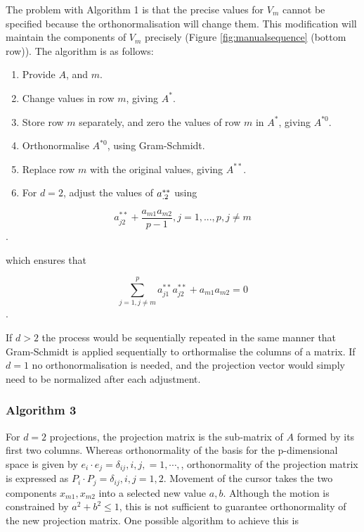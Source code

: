 \documentclass[]{interact}
\theoremstyle{plain}%
\theoremstyle{definition}
\theoremstyle{remark}
\providecommand{\tightlist}{%
  \setlength{\itemsep}{0pt}\setlength{\parskip}{0pt}}
\def\tightlist{}
\begin{document}
The problem with Algorithm 1 is that the precise values for \(V_m\)
cannot be specified because the orthonormalisation will change them.
This modification will maintain the components of \(V_m\) precisely
(Figure \ref{fig:manualsequence} (bottom row)). The algorithm is as
follows:

\begin{enumerate}
\def\labelenumi{\arabic{enumi}.}
\tightlist
\item
  Provide \(A\), and \(m\).
\item
  Change values in row \(m\), giving \(A^*\).
\item
  Store row \(m\) separately, and zero the values of row \(m\) in
  \(A^*\), giving \(A^{*0}\).
\item
  Orthonormalise \(A^{*0}\), using Gram-Schmidt.
\item
  Replace row \(m\) with the original values, giving \(A^{**}\).
\item
  For \(d=2\), adjust the values of \({\boldmath a}^{**}_{.2}\) using
\end{enumerate}

\[a^{**}_{j2}+\frac{a_{m1}a_{m2}}{p-1}, j=1, ..., p, j\neq m\].

which ensures that

\[\sum_{j=1, j\neq m}^p a^{**}_{j1}a^{**}_{j2} + a_{m1}a_{m2} = 0\].

If \(d>2\) the process would be sequentially repeated in the same manner
that Gram-Schmidt is applied sequentially to orthormalise the columns of
a matrix. If \(d=1\) no orthonormalisation is needed, and the projection
vector would simply need to be normalized after each adjustment.

\hypertarget{algorithm-3}{%
\subsubsection{Algorithm 3}\label{algorithm-3}}

For \(d=2\) projections, the projection matrix is the sub-matrix of
\(A\) formed by its first two columns. Whereas orthonormality of the
basis for the p-dimensional space is given by
\(e_i\cdot e_j=\delta_{ij},{i,j,=1,\cdots,}\), orthonormality of the
projection matrix is expressed as
\(P_i\cdot P_j=\delta_{ij}, {i,j=1,2}\). Movement of the cursor takes
the two components \({x_{m1},x_{m2}}\) into a selected new value
\({a,b}\). Although the motion is constrained by \(a^2+b^2\leq 1\), this
is not sufficient to guarantee orthonormality of the new projection
matrix. One possible algorithm to achieve this is
\end{document}
